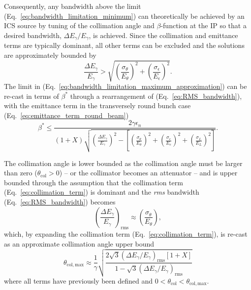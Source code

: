 \documentclass[../main.tex]{subfiles}
\begin{document}
Consequently, any bandwidth above the 
limit (Eq.~\ref{eq:bandwidth_limitation_minimum}) can theoretically be achieved by an ICS source by tuning of the collimation angle and $\beta$-function at the IP so that a desired bandwidth, $\Delta E_{\gamma}/E_{\gamma}$, is achieved. Since the collimation and emittance terms are typically dominant, all other terms can be excluded and the solutions are approximately bounded by
\begin{equation}
\frac{\Delta E_{\gamma}}{E_{\gamma}} > \sqrt{\left(\frac{ \sigma_{\theta}}{E_{\theta}}\right)^{2}+\left(\frac{\sigma_{\epsilon}}{E_{\epsilon}}\right)^{2}}.
\label{eq:bandwidth_limitation_maximum_approximation}
\end{equation}
The limit in (Eq.~\ref{eq:bandwidth_limitation_maximum_approximation}) can be re-cast in terms of $\beta^{*}$ through a rearrangement of (Eq.~\ref{eq:RMS_bandwidth}), with the emittance term in the transversely round bunch case (Eq.~\ref{eq:emittance_term_round_beam})
\begin{equation}
\beta^{*} \leq \frac{2\gamma\epsilon_{n}}{\left(1+X\right)\sqrt{\left(\frac{\Delta E_{\gamma}}{E_{\gamma}}\right)^{2}-\left[\left(\frac{\sigma_{\theta}}{E_{\theta}}\right)^{2}+\left(\frac{\sigma_{e}}{E_{e}}\right)^{2}+\left(\frac{\sigma_{L}}{E_{L}}\right)^{2}\right]}}.
\label{eq:beta_star_maximum limitation}
\end{equation}

The collimation angle is lower bounded as the collimation angle must be larger than zero ($\theta_{\mathrm{col}}>0$) -- or the collimator becomes an attenuator -- and is upper bounded through the assumption that the collimation term (Eq.~\ref{eq:collimation_term}) is dominant and the \textit{rms} bandwidth (Eq.~\ref{eq:RMS_bandwidth}) becomes
\begin{equation}
\left(\frac{\Delta E_{\gamma}}{E_{\gamma}}\right)_{\mathrm{rms}} \approx \left(\frac{\sigma_{\theta}}{E_{\theta}}\right),    
\label{eq:collimation_dominant}
\end{equation}
which, by expanding the collimation term (Eq.~\ref{eq:collimation_term}), is re-cast as an approximate collimation angle upper bound  
\begin{equation}
\theta_{\mathrm{col},\mathrm{max}} \approx \frac{1}{\gamma}\sqrt{\frac{2\sqrt{3}\left(\Delta E_{\gamma}/E_{\gamma}\right)_{\mathrm{rms}}\left[1+X\right]}{1-\sqrt{3}\left(\Delta E_{\gamma}/E_{\gamma}\right)_{\mathrm{rms}}}}
\label{eq:collimation_angle_upper_bound}    
\end{equation}
where all terms have previously been defined and $0<\theta_{\mathrm{col}}<\theta_{\mathrm{col},\mathrm{max}}$.
 
\end{document}
